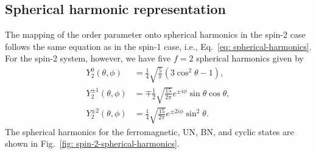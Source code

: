 \subsection{Spherical harmonic representation}
The mapping of the order parameter onto spherical harmonics in the spin-2 case
follows the same equation as in the spin-1 case, i.e.,
Eq.~\eqref{eq: spherical-harmonics}.
For the spin-2 system, however, we have five \(f=2\) spherical harmonics given
by
\begin{align}
    Y_2^0(\theta, \phi) &= \frac{1}{4}\sqrt{\frac{5}{\pi}}(3\cos^2\theta - 1),\\
    Y_2^{\pm 1}(\theta, \phi) &= 
    \mp \frac{1}{2}\sqrt{\frac{15}{2\pi}}e^{\pm i\phi}\sin\theta\cos\theta, \\
    Y_2^{\pm 2}(\theta, \phi) &=
    \frac{1}{4}\sqrt{\frac{15}{2\pi}}e^{\pm 2i\phi}\sin^2\theta.
\end{align}
The spherical harmonics for the ferromagnetic, UN, BN, and cyclic states
are shown in Fig.~\ref{fig: spin-2-spherical-harmonics}.
